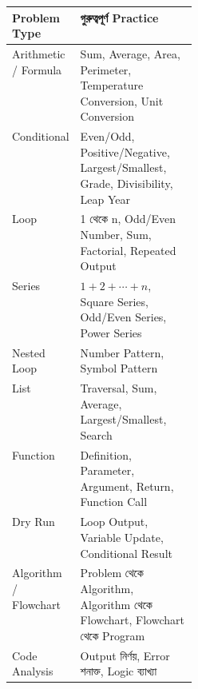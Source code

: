 \begin{tabularx}{\linewidth}{
|L{0.27\linewidth}
|Y|
}
\hline

\textbf{\color{darkTeal}Problem Type}
&
\textbf{\color{darkTeal}গুরুত্বপূর্ণ Practice}
\\
\hline

Arithmetic / Formula
&
Sum, Average, Area, Perimeter, Temperature Conversion, Unit Conversion
\\
\hline

Conditional
&
Even/Odd, Positive/Negative, Largest/Smallest, Grade, Divisibility, Leap Year
\\
\hline

Loop
&
1 থেকে n, Odd/Even Number, Sum, Factorial, Repeated Output
\\
\hline

Series
&
\(1+2+\cdots+n\), Square Series, Odd/Even Series, Power Series
\\
\hline

Nested Loop
&
Number Pattern, Symbol Pattern
\\
\hline

List
&
Traversal, Sum, Average, Largest/Smallest, Search
\\
\hline

Function
&
Definition, Parameter, Argument, Return, Function Call
\\
\hline

Dry Run
&
Loop Output, Variable Update, Conditional Result
\\
\hline

Algorithm / Flowchart
&
Problem থেকে Algorithm, Algorithm থেকে Flowchart, Flowchart থেকে Program
\\
\hline

Code Analysis
&
Output নির্ণয়, Error শনাক্ত, Logic ব্যাখ্যা
\\
\hline

\end{tabularx}


